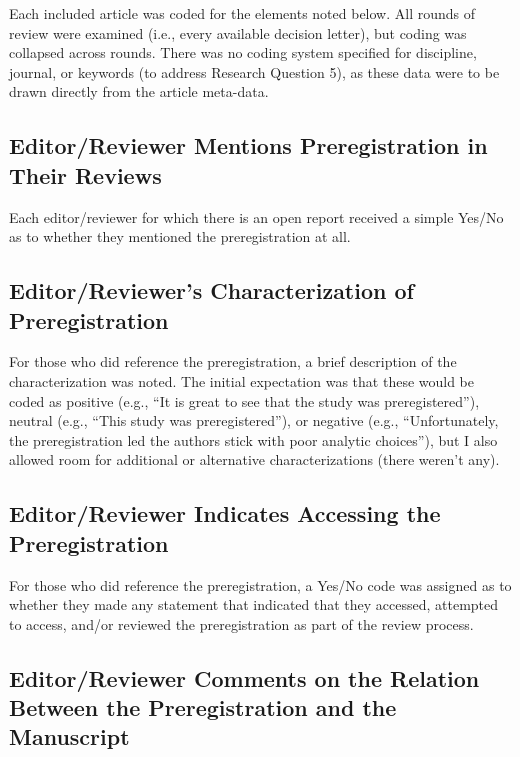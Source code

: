 \documentclass[authordate, meta, issue]{jote-new-article}
\begin{document}
	Each included article was coded for the elements noted below. All rounds of review were examined (i.e., every available decision letter), but coding was collapsed across rounds. There was no coding system specified for discipline, journal, or keywords (to address Research Question 5), as these data were to be drawn directly from the article meta-data.



	\subsection{Editor/Reviewer Mentions Preregistration in Their Reviews}



	Each editor/reviewer for which there is an open report received a simple Yes/No as to whether they mentioned the preregistration at all.



	\subsection{Editor/Reviewer's Characterization of Preregistration}



	For those who did reference the preregistration, a brief description of the characterization was noted. The initial expectation was that these would be coded as positive (e.g., “It is great to see that the study was preregistered”), neutral (e.g., “This study was preregistered”), or negative (e.g., “Unfortunately, the preregistration led the authors stick with poor analytic choices”), but I also allowed room for additional or alternative characterizations (there weren't any).



	\subsection{Editor/Reviewer Indicates Accessing the Preregistration }



	For those who did reference the preregistration, a Yes/No code was assigned as to whether they made any statement that indicated that they accessed, attempted to access, and/or reviewed the preregistration as part of the review process.



	\subsection{Editor/Reviewer Comments on the Relation Between the Preregistration and the Manuscript}
\end{document}
